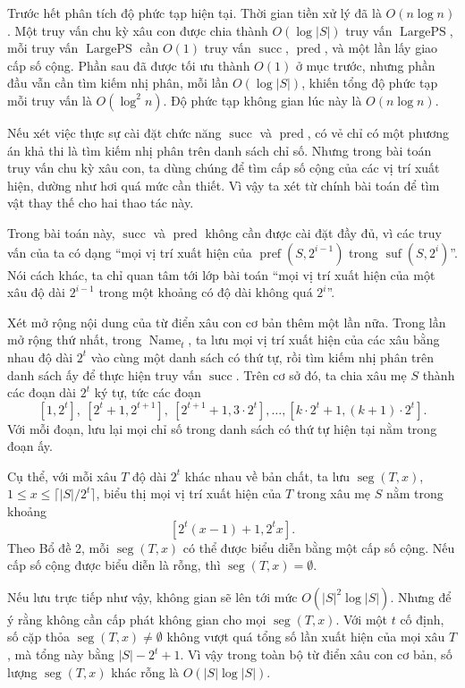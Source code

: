 \documentclass[11pt]{article}
\begin{document}
Trước hết phân tích độ phức tạp hiện tại. Thời gian tiền xử lý đã là
\(O(n\log n)\). Một truy vấn chu kỳ xâu con được chia thành \(O(\log |S|)\)
truy vấn \(\operatorname{LargePS}\), mỗi truy vấn \(\operatorname{LargePS}\) cần
\(O(1)\) truy vấn \(\operatorname{succ}\), \(\operatorname{pred}\), và một lần
lấy giao cấp số cộng. Phần sau đã được tối ưu thành \(O(1)\) ở mục trước,
nhưng phần đầu vẫn cần tìm kiếm nhị phân, mỗi lần \(O(\log |S|)\), khiến tổng
độ phức tạp mỗi truy vấn là \(O(\log^2 n)\). Độ phức tạp không gian lúc này là
\(O(n\log n)\).

Nếu xét việc thực sự cài đặt chức năng \(\operatorname{succ}\) và
\(\operatorname{pred}\), có vẻ chỉ có một phương án khả thi là tìm kiếm nhị
phân trên danh sách chỉ số. Nhưng trong bài toán truy vấn chu kỳ xâu con, ta
dùng chúng để tìm cấp số cộng của các vị trí xuất hiện, dường như hơi quá mức
cần thiết. Vì vậy ta xét từ chính bài toán để tìm vật thay thế cho hai thao
tác này.

Trong bài toán này, \(\operatorname{succ}\) và \(\operatorname{pred}\) không
cần được cài đặt đầy đủ, vì các truy vấn của ta có dạng ``mọi vị trí xuất hiện
của \(\operatorname{pref}(S,2^{i-1})\) trong \(\operatorname{suf}(S,2^i)\)''.
Nói cách khác, ta chỉ quan tâm tới lớp bài toán ``mọi vị trí xuất hiện của một
xâu độ dài \(2^{i-1}\) trong một khoảng có độ dài không quá \(2^i\)''.

Xét mở rộng nội dung của từ điển xâu con cơ bản thêm một lần nữa. Trong lần mở
rộng thứ nhất, trong \(\operatorname{Name}_t\), ta lưu mọi vị trí xuất hiện của
các xâu bằng nhau độ dài \(2^t\) vào cùng một danh sách có thứ tự, rồi tìm kiếm
nhị phân trên danh sách ấy để thực hiện truy vấn \(\operatorname{succ}\). Trên
cơ sở đó, ta chia xâu mẹ \(S\) thành các đoạn dài \(2^t\) ký tự, tức các đoạn
\[
  [1,2^t],\ [2^t+1,2^{t+1}],\ [2^{t+1}+1,3\cdot 2^t],\ldots,
  [k\cdot 2^t+1,(k+1)\cdot 2^t].
\]
Với mỗi đoạn, lưu lại mọi chỉ số trong danh sách có thứ tự hiện tại nằm trong
đoạn ấy.

Cụ thể, với mỗi xâu \(T\) độ dài \(2^t\) khác nhau về bản chất, ta lưu
\(\operatorname{seg}(T,x)\), \(1\le x\le \lceil |S|/2^t\rceil\), biểu thị mọi
vị trí xuất hiện của \(T\) trong xâu mẹ \(S\) nằm trong khoảng
\[
  [2^t(x-1)+1,2^t x].
\]
Theo Bổ đề 2, mỗi \(\operatorname{seg}(T,x)\) có thể được biểu diễn bằng một
cấp số cộng. Nếu cấp số cộng được biểu diễn là rỗng, thì
\(\operatorname{seg}(T,x)=\emptyset\).

Nếu lưu trực tiếp như vậy, không gian sẽ lên tới mức \(O(|S|^2\log |S|)\).
Nhưng để ý rằng không cần cấp phát không gian cho mọi \(\operatorname{seg}(T,x)\).
Với một \(t\) cố định, số cặp thỏa \(\operatorname{seg}(T,x)\ne\emptyset\)
không vượt quá tổng số lần xuất hiện của mọi xâu \(T\), mà tổng này bằng
\(|S|-2^t+1\). Vì vậy trong toàn bộ từ điển xâu con cơ bản, số lượng
\(\operatorname{seg}(T,x)\) khác rỗng là \(O(|S|\log |S|)\).
\end{document}
